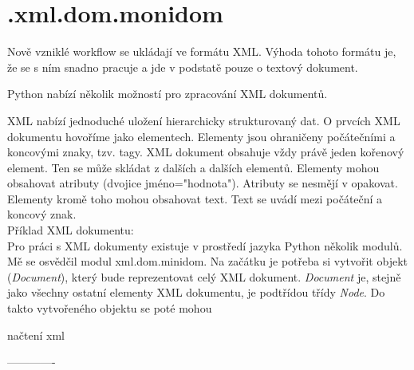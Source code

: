 \newpage
\section{.xml.dom.monidom}
\nocite{python:www}
\nocite{py3:book}

Nově vzniklé workflow se ukládají ve formátu  XML. Výhoda tohoto formátu je, že se s ním snadno pracuje a jde v podstatě pouze o textový dokument.

Python nabízí několik možností pro zpracování XML dokumentů.

XML nabízí jednoduché uložení hierarchicky strukturovaný dat. O prvcích XML dokumentu hovoříme jako elementech. Elementy jsou ohraničeny počátečními a koncovými znaky, tzv. tagy. XML dokument obsahuje vždy právě jeden kořenový element. Ten se může skládat z dalších a dalších elementů. Elementy mohou obsahovat atributy (dvojice jméno="hodnota").  Atributy se nesmějí v opakovat. Elementy kromě toho mohou obsahovat text. Text se uvádí mezi počáteční a koncový znak. \\

\noindent Příklad XML dokumentu$:$ \\



Pro práci s XML dokumenty existuje v prostředí jazyka Python několik modulů. Mě se osvědčil modul xml.dom.minidom. Na začátku je potřeba si vytvořit objekt (\textit{Document}), který bude reprezentovat celý XML dokument. \textit{Document} je, stejně jako všechny ostatní elementy XML dokumentu, je podtřídou třídy \textit{Node}. Do takto vytvořeného objektu se poté mohou

%


načtení xml

-------------


